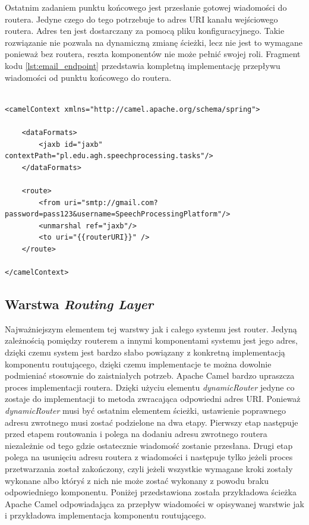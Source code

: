 Ostatnim zadaniem punktu końcowego jest przesłanie gotowej wiadomości do routera. Jedyne czego do tego potrzebuje to adres URI kanału wejściowego routera. Adres ten jest dostarczany za pomocą pliku konfiguracyjnego. Takie rozwiązanie nie pozwala na dynamiczną zmianę ścieżki, lecz nie jest to wymagane ponieważ bez routera, reszta komponentów nie może pełnić swojej roli.
Fragment kodu \ref{lst:email_endpoint} przedstawia kompletną implementację przepływu wiadomości od punktu końcowego do routera.

\lstset{language=XML, tabsize=4, caption=Przykładowa\, kompletna implementacja przypływu wiadomości od punktu końcowego do routera przy pomocy XML DSL.,label=lst:email_endpoint}

\begin{center}
\begin{lstlisting}

<camelContext xmlns="http://camel.apache.org/schema/spring">

	<dataFormats>
		<jaxb id="jaxb" contextPath="pl.edu.agh.speechprocessing.tasks"/>
	</dataFormats>

	<route>
		<from uri="smtp://gmail.com?password=pass123&username=SpeechProcessingPlatform"/>
		<unmarshal ref="jaxb"/>
		<to uri="{{routerURI}}" />
	</route>

</camelContext>
\end{lstlisting}
\end{center}


\subsection{Warstwa \textit{Routing Layer}}

Najważniejszym elementem tej warstwy jak i całego systemu jest router. Jedyną zależnością pomiędzy routerem a innymi komponentami systemu jest jego adres, dzięki czemu system jest bardzo słabo powiązany z konkretną implementacją komponentu routującego, dzięki czemu implementacje te można dowolnie podmieniać stosownie do zaistniałych potrzeb. Apache Camel bardzo upraszcza proces implementacji routera. Dzięki użyciu elementu \textit{dynamicRouter} jedyne co zostaje do implementacji to metoda zwracająca odpowiedni adres URI. Ponieważ \textit{dynamicRouter} musi być ostatnim elementem ścieżki, ustawienie poprawnego adresu zwrotnego musi zostać podzielone na dwa etapy. Pierwszy etap następuje przed etapem routowania i polega na dodaniu adresu zwrotnego routera niezależnie od tego gdzie ostatecznie wiadomość zostanie przesłana. Drugi etap polega na usunięciu adresu routera z wiadomości i następuje tylko jeżeli proces przetwarzania został zakończony, czyli jeżeli wszystkie wymagane kroki zostały wykonane albo któryś z nich nie może zostać wykonany z powodu braku odpowiedniego komponentu. Poniżej przedstawiona została przykładowa ścieżka Apache Camel odpowiadająca za przepływ wiadomości w opisywanej warstwie jak i przykładowa implementacja komponentu routującego.

